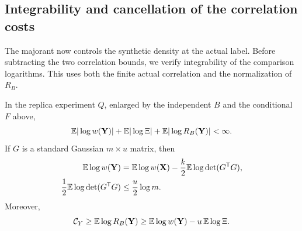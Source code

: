 \subsection{Integrability and cancellation of the correlation costs}

The majorant now controls the synthetic density at the actual label.
Before subtracting the two correlation bounds, we verify integrability
of the comparison logarithms.  This uses both the finite actual
correlation and the normalization of \(R_B\).

\begin{lemma}\label{syn:logs}
In the replica experiment \(Q\), enlarged by the independent \(B\) and
the conditional \(F\) above,
\[
 \mathbb E|\log w(\mathbf Y)|+\mathbb E|\log\Xi|
       +\mathbb E|\log R_B(\mathbf Y)|<\infty.
\]
If \(G\) is a standard Gaussian \(m\times u\) matrix, then
\begin{align}
 \mathbb E\log w(\mathbf Y)
 &=\mathbb E\log w(\mathbf X)-\frac{k}{2}\mathbb E\log\det(G^{\mathsf T}G),
 \label{syn:gram-log}\\
 \frac12\mathbb E\log\det(G^{\mathsf T}G)&\le\frac u2\log m.
 \label{syn:gram-upper}
\end{align}
Moreover,
\begin{equation}\label{syn:correlation-lower}
 \mathcal C_Y
 \ge\mathbb E\log R_B(\mathbf Y)
 \ge\mathbb E\log w(\mathbf Y)-u\,\mathbb E\log\Xi.
\end{equation}
\end{lemma}

